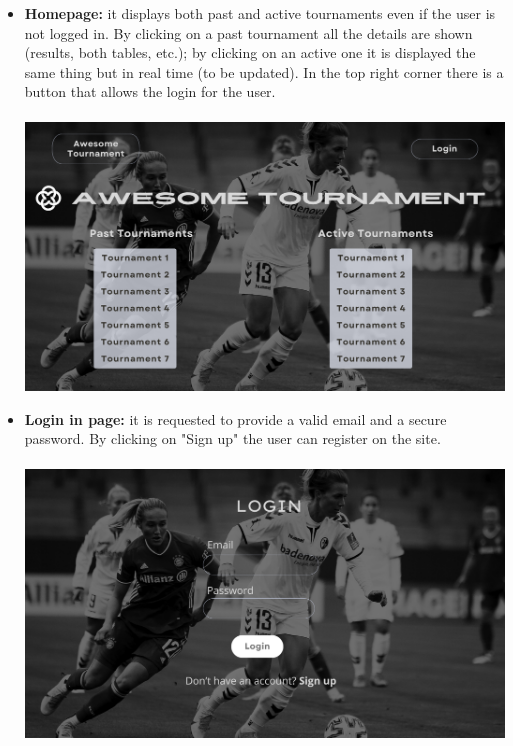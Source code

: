 \begin{itemize}
    \item \textbf{Homepage:} it displays both past and active tournaments even if the user is not logged in. By clicking on a past tournament all the details are shown (results, both tables, etc.); by clicking on an active one it is displayed the same thing but in real time (to be updated). In the top right corner there is a button that allows the login for the user.\\\\
    \includegraphics[scale = 0.36]{sections/homepage.png}

    \item \textbf{Login in page:} it is requested to provide a valid email and a secure password. By clicking on "Sign up" the user can register on the site.\\\\
    \includegraphics[scale = 0.36]{sections/login.png}


\end{itemize}
